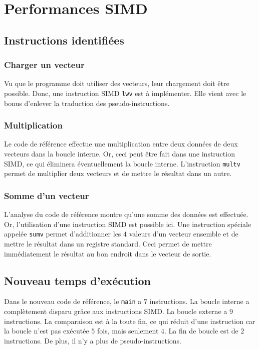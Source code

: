 \documentclass[a11paper]{article}
\begin{document}
\section{Performances SIMD}

\subsection{Instructions identifiées}

\subsubsection{Charger un vecteur}
Vu que le programme doit utiliser des vecteurs, leur chargement doit être
possible. Donc, une instruction SIMD \verb|lwv| est à implémenter. Elle vient
avec le bonus d'enlever la traduction des pseudo-instructions.

\subsubsection{Multiplication}
Le code de référence effectue une multiplication entre deux données de deux
vecteurs dans la boucle interne. Or, ceci peut être fait dans une instruction
SIMD, ce qui éliminera éventuellement la boucle interne. L'instruction
\verb|multv| permet de multiplier deux vecteurs et de mettre le résultat dans
un autre.

\subsubsection{Somme d'un vecteur}
L'analyse du code de référence montre qu'une somme des données est effectuée.
Or, l'utilisation d'une instruction SIMD est possible ici. Une instruction
spéciale appelée \verb|sumv| permet d'additionner les $4$ valeurs d'un vecteur
ensemble et de mettre le résultat dans un registre standard. Ceci permet de
mettre immédiatement le résultat au bon endroit dans le vecteur de sortie.

\subsection{Nouveau temps d'exécution}
Dans le nouveau code de référence, le \verb|main| a $7$ instructions. La boucle
interne a complètement disparu grâce aux instructions SIMD. La boucle
externe a $9$ instructions. La comparaison est à la toute fin, ce qui réduit
d'une instruction car la boucle n'est pas exécutée $5$ fois, mais seulement
$4$. La fin de boucle est de $2$ instructions. De plus, il n'y a plus de
pseudo-instructions.
\end{document}

